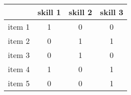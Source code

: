 \begin{table}
\centering
\begin{tabular}{c|ccc}
\toprule
& skill 1 & skill 2 & skill 3 \\
\midrule
item 1 & 1 & 0 & 0 \\
item 2 & 0 & 1 & 1 \\
item 3 & 0 & 1 & 0 \\
item 4 & 1 & 0 & 1 \\
item 5 & 0 & 0 & 1 \\
\bottomrule
\end{tabular}
\end{table}